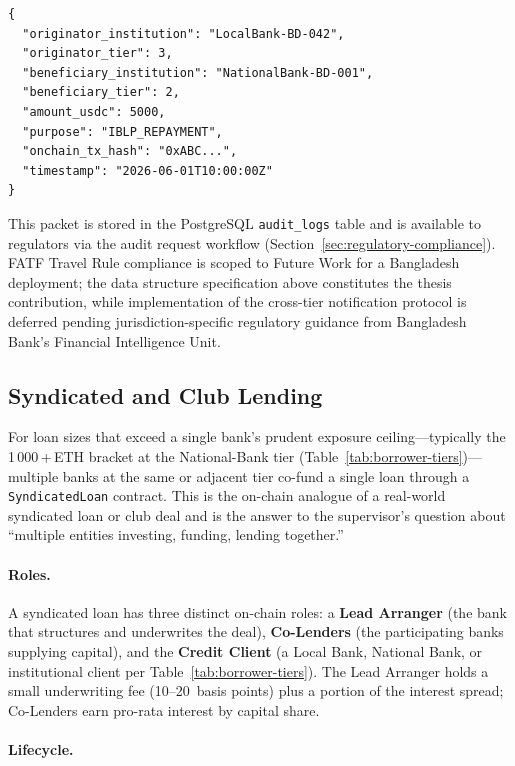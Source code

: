 \documentclass[12pt,a4paper]{report}
\begin{document}
\begin{verbatim}
{
  "originator_institution": "LocalBank-BD-042",
  "originator_tier": 3,
  "beneficiary_institution": "NationalBank-BD-001",
  "beneficiary_tier": 2,
  "amount_usdc": 5000,
  "purpose": "IBLP_REPAYMENT",
  "onchain_tx_hash": "0xABC...",
  "timestamp": "2026-06-01T10:00:00Z"
}
\end{verbatim}

This packet is stored in the PostgreSQL \texttt{audit\_logs} table and is available to regulators via the audit request workflow (Section~\ref{sec:regulatory-compliance}). FATF Travel Rule compliance is scoped to Future Work for a Bangladesh deployment; the data structure specification above constitutes the thesis contribution, while implementation of the cross-tier notification protocol is deferred pending jurisdiction-specific regulatory guidance from Bangladesh Bank's Financial Intelligence Unit.

\subsection{Syndicated and Club Lending}
\label{sec:syndicated-lending}

For loan sizes that exceed a single bank's prudent exposure ceiling---typically the 1\,000\,+\,ETH bracket at the National-Bank tier (Table~\ref{tab:borrower-tiers})---multiple banks at the same or adjacent tier co-fund a single loan through a \texttt{SyndicatedLoan} contract. This is the on-chain analogue of a real-world syndicated loan or club deal and is the answer to the supervisor's question about ``multiple entities investing, funding, lending together.''

\paragraph{Roles.}
A syndicated loan has three distinct on-chain roles: a \textbf{Lead Arranger} (the bank that structures and underwrites the deal), \textbf{Co-Lenders} (the participating banks supplying capital), and the \textbf{Credit Client} (a Local Bank, National Bank, or institutional client per Table~\ref{tab:borrower-tiers}). The Lead Arranger holds a small underwriting fee (10--20~basis points) plus a portion of the interest spread; Co-Lenders earn pro-rata interest by capital share.

\paragraph{Lifecycle.}
\end{document}
